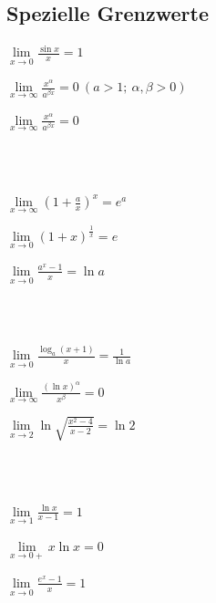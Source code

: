 	\subsection{Spezielle Grenzwerte}
  		\begin{minipage}[c]{6.33cm}
			$\lim\limits_{x \to 0} \frac{\sin{x}}{x} = 1 $
  		\end{minipage}
  		\begin{minipage}[c]{6.33cm}
			$ \lim\limits_{x \to \infty} \frac{x^{\alpha}}{a^{\beta x}} = 0 \:(a>1;\:\alpha, \beta > 0 ) $
  		\end{minipage}
  		\begin{minipage}[c]{6.33cm}
			$ \lim\limits_{x \to \infty} \frac{x^\alpha}{a^{\beta x}} = 0 $
  		\end{minipage} \\ \\
  		\begin{minipage}[c]{6.33cm}
			$ \lim\limits_{x \to \infty} (1+\frac{a}{x})^x=e^a $
  		\end{minipage}
  		\begin{minipage}[c]{6.33cm}
			$ \lim\limits_{x \to 0} (1+x)^{\frac{1}{x}}=e $
  		\end{minipage}
  		\begin{minipage}[c]{6.33cm}
				$ \lim\limits_{x \to 0} \frac{a^x-1}{x}=\ln a $
  		\end{minipage} \\ \\
  		\begin{minipage}[c]{6.33cm}
				$ \lim\limits_{x \to 0} \frac{\log_a(x+1)}{x} = \frac{1}{\ln a} $
  		\end{minipage}
  		\begin{minipage}[c]{6.33cm}
			$ \lim\limits_{x \to \infty} \frac{(\ln x)^\alpha}{x^{\beta}} = 0 $
  		\end{minipage}
  		\begin{minipage}[c]{6.33cm}
			$ \lim\limits_{x \to 2} \ln{\sqrt{\frac{x^2-4}{x-2}}} = \ln{2} $
  		\end{minipage} \\ \\
  		\begin{minipage}[c]{6.33cm}
			$ \lim\limits_{x \to 1} \frac{\ln{x}}{x-1} = 1 $
  		\end{minipage}
  		\begin{minipage}[c]{6.33cm}
			$ \lim\limits_{x \to 0+} x \ln{x} = 0 $
  		\end{minipage}
  		\begin{minipage}[c]{6.33cm}
			$ \lim\limits_{x \to 0} \frac{e^x-1}{x}=1 $
  		\end{minipage} \\ \\
